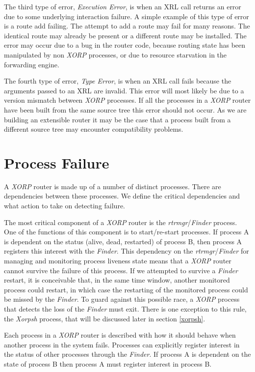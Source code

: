\documentclass[11pt]{article}
\makeatletter
\newcommand{\xorp} {{\em XORP}\@\xspace}
\newcommand{\finder} {{\em Finder}\@\xspace}
\newcommand{\xorpsh} {{\em Xorpsh}\@\xspace}
\newcommand{\rtrmgr} {{\em rtrmgr}\@\xspace}
\makeatother
\begin{document}
The third type of error, {\em Execution Error}, is when an XRL call
returns an error due to some underlying interaction failure. A simple
example of this type of error is a route add failing. The attempt to
add a route may fail for many reasons. The identical route may already
be present or a different route may be installed. The error may occur
due to a bug in the router code, because routing state has been
manipulated by non \xorp processes, or due to resource starvation in
the forwarding engine.

The fourth type of error, {\em Type Error}, is when an XRL call fails
because the arguments passed to an XRL are invalid. This error will
most likely be due to a version mismatch between \xorp processes. If
all the processes in a \xorp router have been built from the same
source tree this error should not occur. As we are building an
extensible router it may be the case that a process built from a
different source tree may encounter compatibility problems.

\section{\label{pfailure}Process Failure}

A \xorp router is made up of a number of distinct processes. There are
dependencies between these processes. We define the critical
dependencies and what action to take on detecting failure.

The most critical component of a \xorp router is the \rtrmgr/\finder
process. One of the functions of this component is to start/re-start
processes. If process A is dependent on the status (alive, dead,
restarted) of process B, then process A registers this interest with
the \finder. This dependency on the \rtrmgr/\finder for managing and
monitoring process liveness state means that a \xorp router cannot
survive the failure of this process. If we attempted to survive a
\finder restart, it is conceivable that, in the same time window,
another monitored process could restart, in which case the restarting
of the monitored process could be missed by the \finder. To guard
against this possible race, a \xorp process that detects the loss of
the \finder must exit. There is one exception to this rule, the
\xorpsh process, that will be discussed later in section \ref{xorpsh}.

Each process in a \xorp router is described with how it should behave
when another process in the system fails. Processes can explicitly
register interest in the status of other processes through the
\finder. If process A is dependent on the state of process B then
process A must register interest in process B.
\end{document}
